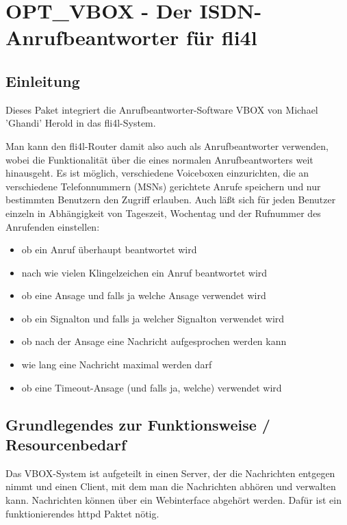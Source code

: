 {
\section {OPT\_VBOX - Der ISDN-Anrufbeantworter für fli4l}
}

\subsection{Einleitung}

Dieses Paket integriert die Anrufbeantworter-Software VBOX von 
Michael ’Ghandi’ Herold in das fli4l-System.

Man kann den fli4l-Router damit also auch als Anrufbeantworter verwenden, 
wobei die Funktionalität über die eines normalen Anrufbeantworters weit hinausgeht. 
Es ist möglich, verschiedene Voiceboxen einzurichten, die an verschiedene Telefonnummern 
(MSNs) gerichtete Anrufe speichern und nur bestimmten Benutzern den Zugriff erlauben. 
Auch läßt sich für jeden Benutzer einzeln in Abhängigkeit von Tageszeit, Wochentag und 
der Rufnummer des Anrufenden einstellen:

\begin{itemize}
    \item ob ein Anruf überhaupt beantwortet wird
    \item nach wie vielen Klingelzeichen ein Anruf beantwortet wird
    \item ob eine Ansage und falls ja welche Ansage verwendet wird
    \item ob ein Signalton und falls ja welcher Signalton verwendet wird
    \item ob nach der Ansage eine Nachricht aufgesprochen werden kann
    \item wie lang eine Nachricht maximal werden darf
    \item ob eine Timeout-Ansage (und falls ja, welche) verwendet wird
\end{itemize}

\subsection{Grundlegendes zur Funktionsweise / Resourcenbedarf}

Das VBOX-System ist aufgeteilt in einen Server, der die Nachrichten entgegen nimmt
und einen Client, mit dem man die Nachrichten abhören und verwalten kann.
Nachrichten können über ein Webinterface abgehört werden. Dafür ist ein
funktionierendes httpd Paktet nötig. 

